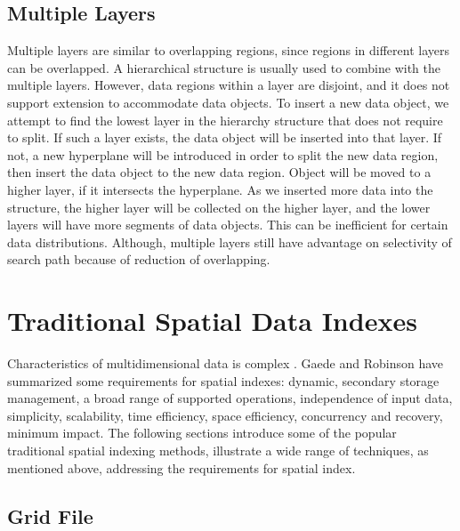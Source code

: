 \subsection{Multiple Layers}
Multiple layers \cite{Gaede:1998fp} are similar to overlapping regions, since regions in different layers can be overlapped. A hierarchical structure is usually used to combine with the multiple layers. However, data regions within a layer are disjoint, and it does not support extension to accommodate data objects. To insert a new data object, we attempt to find the lowest layer in the hierarchy structure that does not require to split. If such a layer exists, the data object will be inserted into that layer. If not, a new hyperplane will be introduced in order to split the new data region, then insert the data object to the new data region. Object will be moved to a higher layer, if it intersects the hyperplane. As we inserted more data into the structure, the higher layer will be collected on the higher layer, and the lower layers will have more segments of data objects. This can be inefficient for certain data distributions. Although, multiple layers still have advantage on selectivity of search path because of reduction of overlapping. 



\section{Traditional Spatial Data Indexes}

Characteristics of multidimensional data is complex  \cite{Gaede:1998fp, Robinson:1981id}. Gaede and Robinson have summarized some requirements for spatial indexes: dynamic, secondary storage management, a broad range of supported operations, independence of input data, simplicity, scalability, time efficiency, space efficiency, concurrency and recovery, minimum impact. The following sections introduce some of the popular traditional spatial indexing methods,  illustrate a wide range of techniques, as mentioned above, addressing the requirements for spatial index. 




\subsection{Grid File}

